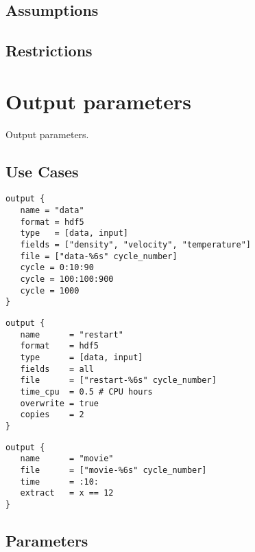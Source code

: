 \documentclass{book}
\begin{document}
\subsection{Assumptions}
\subsection{Restrictions}


\section{Output parameters} \label{s:output}

Output parameters.

\subsection{Use Cases}

\begin{verbatim}
output { 
   name = "data"
   format = hdf5
   type   = [data, input]
   fields = ["density", "velocity", "temperature"]
   file = ["data-%6s" cycle_number]
   cycle = 0:10:90
   cycle = 100:100:900
   cycle = 1000
}
\end{verbatim}

\begin{verbatim}
output { 
   name      = "restart"
   format    = hdf5
   type      = [data, input]
   fields    = all
   file      = ["restart-%6s" cycle_number]
   time_cpu  = 0.5 # CPU hours
   overwrite = true
   copies    = 2
}
\end{verbatim}

\begin{verbatim}
output { 
   name      = "movie"
   file      = ["movie-%6s" cycle_number]
   time      = :10:
   extract   = x == 12
}
\end{verbatim}

\subsection{Parameters}
\end{document}
